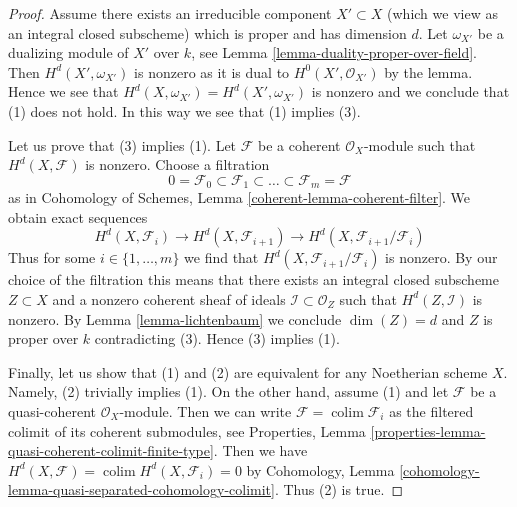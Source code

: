 \documentclass[10pt,a4paper]{amsart}
\theoremstyle{plain}
\theoremstyle{definition}
\theoremstyle{remark}
\numberwithin{equation}{subsection}
\def\colim{\mathop{\mathrm{colim}}\nolimits}
\begin{document}
\begin{proof}
Assume there exists an irreducible component $X' \subset X$ (which we view
as an integral closed subscheme) which is proper and has dimension $d$.
Let $\omega_{X'}$ be a dualizing module of $X'$ over $k$, see
Lemma \ref{lemma-duality-proper-over-field}. Then
$H^d(X', \omega_{X'})$ is nonzero as it is dual to $H^0(X', \mathcal{O}_{X'})$
by the lemma. Hence we see that $H^d(X, \omega_{X'}) = H^d(X', \omega_{X'})$
is nonzero and we conclude that (1) does not hold.
In this way we see that (1) implies (3).

\medskip\noindent
Let us prove that (3) implies (1).
Let $\mathcal{F}$ be a coherent $\mathcal{O}_X$-module such that
$H^d(X, \mathcal{F})$ is nonzero. Choose a filtration
$$
0 = \mathcal{F}_0 \subset \mathcal{F}_1 \subset
\ldots \subset \mathcal{F}_m = \mathcal{F}
$$
as in Cohomology of Schemes, Lemma \ref{coherent-lemma-coherent-filter}.
We obtain exact sequences
$$
H^d(X, \mathcal{F}_i) \to H^d(X, \mathcal{F}_{i + 1}) \to
H^d(X, \mathcal{F}_{i + 1}/\mathcal{F}_i)
$$
Thus for some $i \in \{1, \ldots, m\}$ we find that
$H^d(X, \mathcal{F}_{i + 1}/\mathcal{F}_i)$ is nonzero.
By our choice of the filtration this means that there exists
an integral closed subscheme $Z \subset X$
and a nonzero coherent sheaf of ideals $\mathcal{I} \subset \mathcal{O}_Z$
such that $H^d(Z, \mathcal{I})$ is nonzero.
By Lemma \ref{lemma-lichtenbaum}
we conclude $\dim(Z) = d$ and $Z$ is proper over $k$
contradicting (3). Hence (3) implies (1).

\medskip\noindent
Finally, let us show that (1) and (2) are equivalent for any Noetherian scheme
$X$. Namely, (2) trivially implies (1). On the other hand, assume (1) and
let $\mathcal{F}$ be a quasi-coherent $\mathcal{O}_X$-module. Then we can write
$\mathcal{F} = \colim \mathcal{F}_i$ as the filtered colimit of its coherent
submodules, see
Properties, Lemma \ref{properties-lemma-quasi-coherent-colimit-finite-type}.
Then we have $H^d(X, \mathcal{F}) = \colim H^d(X, \mathcal{F}_i) = 0$
by Cohomology, Lemma \ref{cohomology-lemma-quasi-separated-cohomology-colimit}.
Thus (2) is true.
\end{proof}
\end{document}
